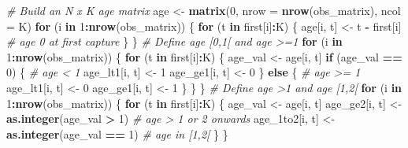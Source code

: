 \documentclass[
  12pt,
]{krantz}
\newenvironment{Shaded}{\begin{snugshade}}{\end{snugshade}}
\newcommand{\AttributeTok}[1]{\textcolor[rgb]{0.13,0.29,0.53}{#1}}
\newcommand{\CommentTok}[1]{\textcolor[rgb]{0.56,0.35,0.01}{\textit{#1}}}
\newcommand{\ControlFlowTok}[1]{\textcolor[rgb]{0.13,0.29,0.53}{\textbf{#1}}}
\newcommand{\DecValTok}[1]{\textcolor[rgb]{0.00,0.00,0.81}{#1}}
\newcommand{\FunctionTok}[1]{\textcolor[rgb]{0.13,0.29,0.53}{\textbf{#1}}}
\newcommand{\NormalTok}[1]{#1}
\newcommand{\OtherTok}[1]{\textcolor[rgb]{0.56,0.35,0.01}{#1}}
\newcommand{\SpecialCharTok}[1]{\textcolor[rgb]{0.81,0.36,0.00}{\textbf{#1}}}
\begin{document}
\begin{Shaded}
\begin{Highlighting}[]
\CommentTok{\# Build an N x K age matrix}
\NormalTok{age }\OtherTok{\textless{}{-}} \FunctionTok{matrix}\NormalTok{(}\DecValTok{0}\NormalTok{, }\AttributeTok{nrow =} \FunctionTok{nrow}\NormalTok{(obs\_matrix), }\AttributeTok{ncol =}\NormalTok{ K)}
\ControlFlowTok{for}\NormalTok{ (i }\ControlFlowTok{in} \DecValTok{1}\SpecialCharTok{:}\FunctionTok{nrow}\NormalTok{(obs\_matrix)) \{}
  \ControlFlowTok{for}\NormalTok{ (t }\ControlFlowTok{in}\NormalTok{ first[i]}\SpecialCharTok{:}\NormalTok{K) \{}
\NormalTok{    age[i, t] }\OtherTok{\textless{}{-}}\NormalTok{ t }\SpecialCharTok{{-}}\NormalTok{ first[i]   }\CommentTok{\# age 0 at first capture}
\NormalTok{  \}}
\NormalTok{\}}
\CommentTok{\# Define age [0,1[ and age \textgreater{}=1}
\ControlFlowTok{for}\NormalTok{ (i }\ControlFlowTok{in} \DecValTok{1}\SpecialCharTok{:}\FunctionTok{nrow}\NormalTok{(obs\_matrix)) \{}
  \ControlFlowTok{for}\NormalTok{ (t }\ControlFlowTok{in}\NormalTok{ first[i]}\SpecialCharTok{:}\NormalTok{K) \{}
\NormalTok{    age\_val }\OtherTok{\textless{}{-}}\NormalTok{ age[i, t]}
    \ControlFlowTok{if}\NormalTok{ (age\_val }\SpecialCharTok{==} \DecValTok{0}\NormalTok{) \{ }\CommentTok{\# age \textless{} 1}
\NormalTok{      age\_lt1[i, t] }\OtherTok{\textless{}{-}} \DecValTok{1}
\NormalTok{      age\_ge1[i, t] }\OtherTok{\textless{}{-}} \DecValTok{0}
\NormalTok{    \} }\ControlFlowTok{else}\NormalTok{ \{            }\CommentTok{\# age \textgreater{}= 1}
\NormalTok{      age\_lt1[i, t] }\OtherTok{\textless{}{-}} \DecValTok{0}  
\NormalTok{      age\_ge1[i, t] }\OtherTok{\textless{}{-}} \DecValTok{1}
\NormalTok{    \}}
\NormalTok{  \}}
\NormalTok{\}}
\CommentTok{\# Define age \textgreater{}1 and age [1,2[}
\ControlFlowTok{for}\NormalTok{ (i }\ControlFlowTok{in} \DecValTok{1}\SpecialCharTok{:}\FunctionTok{nrow}\NormalTok{(obs\_matrix)) \{}
  \ControlFlowTok{for}\NormalTok{ (t }\ControlFlowTok{in}\NormalTok{ first[i]}\SpecialCharTok{:}\NormalTok{K) \{}
\NormalTok{    age\_val }\OtherTok{\textless{}{-}}\NormalTok{ age[i, t]}
\NormalTok{    age\_ge2[i, t] }\OtherTok{\textless{}{-}} \FunctionTok{as.integer}\NormalTok{(age\_val }\SpecialCharTok{\textgreater{}} \DecValTok{1}\NormalTok{)   }\CommentTok{\# age \textgreater{} 1 or 2 onwards}
\NormalTok{    age\_1to2[i, t] }\OtherTok{\textless{}{-}} \FunctionTok{as.integer}\NormalTok{(age\_val }\SpecialCharTok{==} \DecValTok{1}\NormalTok{) }\CommentTok{\# age in [1,2[}
\NormalTok{  \}}
\NormalTok{\}}
\end{Highlighting}
\end{Shaded}
\end{document}
